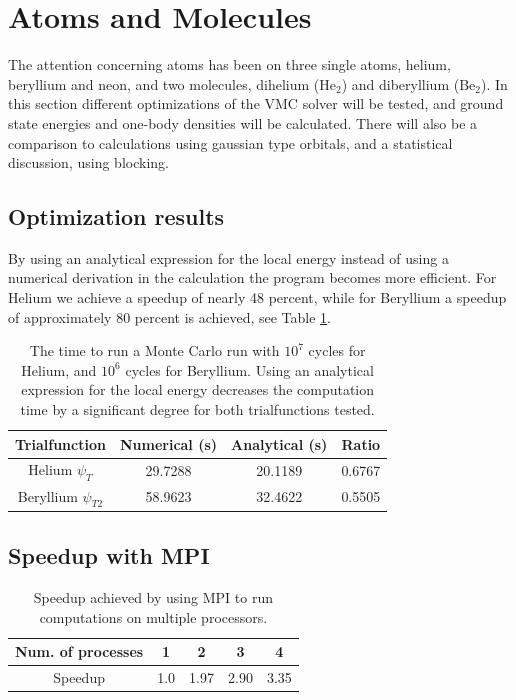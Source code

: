 \section{Atoms and Molecules}
	The attention concerning atoms has been on three single atoms, helium, beryllium and neon, and two molecules, dihelium ($\mbox{He}_2$) and diberyllium ($\mbox{Be}_2$). In this section different optimizations of the VMC solver will be tested, and ground state energies and one-body densities will be calculated. There will also be a comparison to calculations using gaussian type orbitals, and a statistical discussion, using blocking.
	

	\subsection{Optimization results}
		By using an analytical expression for the local energy instead of using a numerical derivation in the calculation the program becomes more efficient. For Helium we achieve a speedup of nearly 48 percent, while for Beryllium a speedup of approximately 80 percent is achieved, see Table \ref{tab:analyticVSNumeric}.

		\begin{table}
			\center
			\begin{tabular}{ c | c | c | c }
			   	\textbf{Trialfunction} & Numerical (s) & Analytical (s) & Ratio
			    \\ \hline
			    Helium $\psi_{T}$ & 29.7288 & 20.1189	& 0.6767\tabularnewline
			    Beryllium $\psi_{T2}$ & 58.9623  &	32.4622 & 0.5505\tabularnewline
			\end{tabular}
			\caption{The time to run a Monte Carlo run with \(10^7\) cycles for Helium, and \(10^6\) cycles for Beryllium. Using an analytical expression for the local energy decreases the computation time by a significant degree for both trialfunctions tested. }
			\label{tab:analyticVSNumeric}
		\end{table}

	\subsection{Speedup with MPI}
		\begin{table}
			\center
			\begin{tabular}{ c | c| c| c| c}
				\textbf{Num. of processes} &	1	&	2	&	3	&	4
				\\ \hline
				Speedup	&	1.0	&	1.97	&	2.90	&	3.35
			\end{tabular}
			\caption{Speedup achieved by using MPI to run computations on multiple processors.}
			\label{tab:MPI_speedup}
		\end{table}

